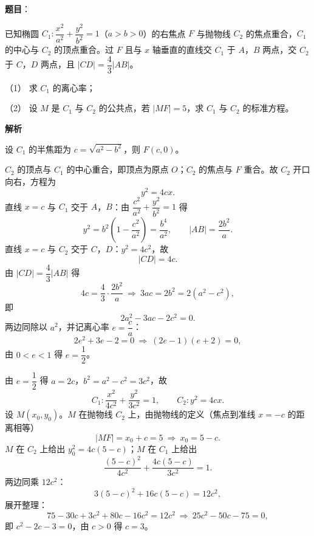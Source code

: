 \begin{answer}

\textbf{题目}：

已知椭圆 $C_1:\dfrac{x^2}{a^2}+\dfrac{y^2}{b^2}=1$（$a>b>0$）的右焦点 $F$ 与抛物线 $C_2$ 的焦点重合，$C_1$ 的中心与 $C_2$ 的顶点重合。过 $F$ 且与 $x$ 轴垂直的直线交 $C_1$ 于 $A$，$B$ 两点，交 $C_2$ 于 $C$，$D$ 两点，且 $|CD|=\dfrac43|AB|$。

（1） 求 $C_1$ 的离心率；

（2） 设 $M$ 是 $C_1$ 与 $C_2$ 的公共点，若 $|MF|=5$，求 $C_1$ 与 $C_2$ 的标准方程。

\textbf{解析}


设 $C_1$ 的半焦距为 $c=\sqrt{a^2-b^2}$，则 $F(c,0)$。

$C_2$ 的顶点与 $C_1$ 的中心重合，即顶点为原点 $O$；$C_2$ 的焦点与 $F$ 重合。故 $C_2$ 开口向右，方程为
\nopagebreak[4]
\[y^2=4cx .\]
直线 $x=c$ 与 $C_1$ 交于 $A$，$B$：由 $\dfrac{c^2}{a^2}+\dfrac{y^2}{b^2}=1$ 得
\nopagebreak[4]
\[y^2=b^2\left(1-\frac{c^2}{a^2}\right)=\frac{b^4}{a^2},\qquad |AB|=\frac{2b^2}{a} .\]
直线 $x=c$ 与 $C_2$ 交于 $C$，$D$：$y^2=4c^2$，故
\nopagebreak[4]
\[|CD|=4c .\]
由 $|CD|=\dfrac43|AB|$ 得
\nopagebreak[4]
\[4c=\frac43\cdot\frac{2b^2}{a}\ \Longrightarrow\ 3ac=2b^2=2(a^2-c^2),\]
即
\nopagebreak[4]
\[2a^2-3ac-2c^2=0 .\]
两边同除以 $a^2$，并记离心率 $e=\dfrac ca$：
\nopagebreak[4]
\[2e^2+3e-2=0\ \Longrightarrow\ (2e-1)(e+2)=0,\]
由 $0<e<1$ 得 $e=\dfrac12$。


由 $e=\dfrac12$ 得 $a=2c$，$b^2=a^2-c^2=3c^2$，故
\nopagebreak[4]
\[C_1:\frac{x^2}{4c^2}+\frac{y^2}{3c^2}=1,\qquad C_2:y^2=4cx .\]
设 $M(x_0,y_0)$。$M$ 在抛物线 $C_2$ 上，由抛物线的定义（焦点到准线 $x=-c$ 的距离相等）
\nopagebreak[4]
\[|MF|=x_0+c=5\ \Longrightarrow\ x_0=5-c .\]
$M$ 在 $C_2$ 上给出 $y_0^2=4c(5-c)$；$M$ 在 $C_1$ 上给出
\nopagebreak[4]
\[\frac{(5-c)^2}{4c^2}+\frac{4c(5-c)}{3c^2}=1 .\]
两边同乘 $12c^2$：
\nopagebreak[4]
\[3(5-c)^2+16c(5-c)=12c^2,\]
展开整理：
\nopagebreak[4]
\[75-30c+3c^2+80c-16c^2=12c^2\ \Longrightarrow\ 25c^2-50c-75=0,\]
即 $c^2-2c-3=0$，由 $c>0$ 得 $c=3$。


\end{answer}
